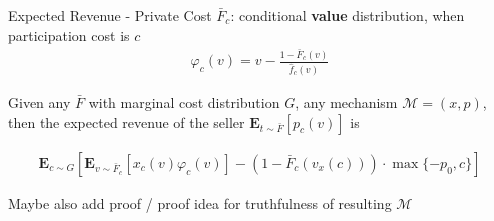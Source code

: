 \documentclass{beamer}
\begin{document}
\begin{frame}{Expected Revenue - Private Cost}
  $\bar{F}_c$: conditional \textbf{value} distribution, when participation cost is $c$
  \begin{align*}
    \varphi_c(v) = v - \frac{1- \bar{F}_c(v)}{\hat{f}_c(v)}
  \end{align*}

  \begin{theorem}
    Given any $\bar{F}$ with marginal cost distribution $G$, any mechanism $\mathcal{M}=(x,p)$, then the expected revenue of the seller $\mathbf{E}_{t \sim \bar{F}}\left[p_c(v)\right] $ is

    \begin{align*}
      \mathbf{E}_{c \sim G}\left[\mathbf{E}_{v\sim\bar{F}_c}\left[x_c(v)\varphi_c(v)\right] - (1-\bar{F}_c(v_x(c))) \cdot \max\{-p_0,c\}\right]
    \end{align*}
  \end{theorem}

  Maybe also add proof / proof idea for truthfulness of resulting $\mathcal{M}$
\end{frame}
\end{document}
